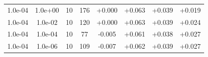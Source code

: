 \documentclass[11pt,a4paper]{article}
\begin{document}
\begin{table}
{\begin{tabular}{*{8}c}

 1.0e-04 	 & 1.0e+00 	 & 10 & 176 	 & +0.000 & +0.063 & +0.039 & +0.019 \\ 
 1.0e-04 	 & 1.0e-02 	 & 10 & 120 	 & +0.000 & +0.063 & +0.039 & +0.024 \\ 
 1.0e-04 	 & 1.0e-04 	 & 10 & 77 	 & -0.005 & +0.061 & +0.038 & +0.027 \\ 
 1.0e-04 	 & 1.0e-06 	 & 10 & 109 	 & -0.007 & +0.062 & +0.039 & +0.027 \\ 



\end{tabular}}
\end{table}
\end{document}
